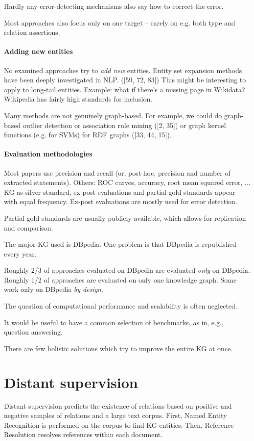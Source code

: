 Hardly any error-detecting mechanisms also say how to correct the error.

Most approaches also focus only on one target -- rarely on e.g. both type and
relation assertions.

\paragraph{Adding new entities}
No examined approaches try to \textit{add new} entities. Entity set expansion
methods have been deeply investigated in NLP. ([59, 72, 83])
This might be interesting to apply to long-tail entities.
Example: what if there's a missing page in Wikidata? Wikipedia has fairly high
standards for inclusion.

Many methods are not genuinely graph-based. For example, we could do graph-based
outlier detection or association rule mining ([2, 35]) or graph kernel functions
(e.g. for SVMs) for RDF graphs ([33, 44, 15]).

\paragraph{Evaluation methodologies}

Most papers use precision and recall (or, post-hoc, precision and number of
extracted statements). Others: ROC curves, accuracy, root mean squared error,
...
KG as silver standard, ex-post evaluations and partial gold standards appear
with equal frequency. Ex-post evaluations are mostly used for error detection.

Partial gold standards are usually publicly available, which allows for
replication and comparison.

The major KG used is DBpedia. One problem is that DBpedia is republished every
year.

Roughly 2/3 of approaches evaluated on DBpedia are evaluated \textit{only} on
DBpedia. Roughly 1/2 of approaches are evaluated on only one knowledge graph.
Some work only on DBpedia \textit{by design}.

The question of computational performance and scalability is often neglected.

It would be useful to have a common selection of benchmarks, as in, e.g.,
question answering.

There are few holistic solutions which try to improve the entire KG at once.

\section{Distant supervision}
\label{distant-supervision}
Distant supervision predicts the existence of relations based on positive and
negative samples of relations and a large text corpus.
First, Named Entity Recognition is performed on the corpus to find KG entities.
Then, Reference Resolution resolves references within each document.

